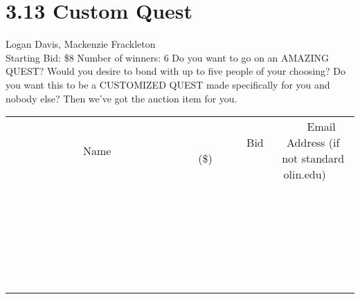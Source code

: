 \documentclass[11pt]{article}
\begin{document}
\section*{3.13 Custom Quest}
Logan Davis, Mackenzie Frackleton
\\
Starting Bid: \$8
\newline
Number of winners: 6
\newline
Do you want to go on an AMAZING QUEST? Would you desire to bond with up to five people of your choosing? Do you want this to be a CUSTOMIZED QUEST made specifically for you and nobody else? Then we've got the auction item for you.
\\[6ex]
\begin{tabular}{c c c}
~~~~~~~~~~~~~Name~~~~~~~~~~~~~ & ~~~~~~~~~Bid (\$)~~~~~~~~~  & ~~~Email Address (if not standard olin.edu)~~~\\
 & & \\
\hline
 & & \\
\hline
 & & \\
\hline
 & & \\
\hline
 & & \\
\hline
 & & \\
\hline
 & & \\
\hline
 & & \\
\hline
 & & \\
\hline
 & & \\
\hline
 & & \\
\hline
 & & \\
\hline
 & & \\
\hline
 & & \\
\hline
 & & \\
\hline
 & & \\
\hline
 & & \\
\hline
 & & \\
\hline
 & & \\
\hline
 & & \\
\hline
 & & \\
\hline
 & & \\
\hline
 & & \\
\hline
 & & \\
\hline
 & & \\
\hline
 & & \\
\hline
\end{tabular}
\newpage
\end{document}
